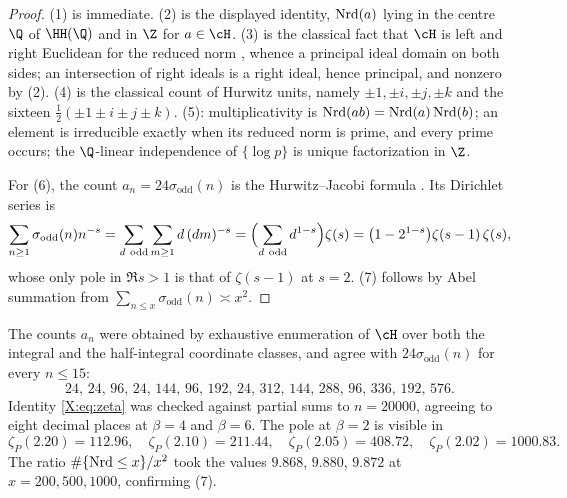 \begin{proof}
(1) is immediate. (2) is the displayed identity, $\operatorname{Nrd}(a)$ lying in the centre $\Q$ of
$\HH(\Q)$ and in $\Z$ for $a\in\cH$. (3) is the classical fact that $\cH$ is left and right
Euclidean for the reduced norm \cite{Hurwitz}, whence a principal ideal domain on both
sides; an intersection of right ideals is a right ideal, hence principal, and nonzero by (2). (4) is the classical
count of Hurwitz units, namely $\pm1,\pm i,\pm j,\pm k$ and the sixteen
$\tfrac12(\pm1\pm i\pm j\pm k)$. (5): multiplicativity is $\operatorname{Nrd}(ab)=\operatorname{Nrd}(a)\operatorname{Nrd}(b)$; an
element is irreducible exactly when its reduced norm is prime, and every prime occurs; the
$\Q$-linear independence of $\{\log p\}$ is unique factorization in $\Z$.

For (6), the count $a_n=24\sigma_{\mathrm{odd}}(n)$ is the Hurwitz--Jacobi formula
\cite{Hurwitz}. Its
Dirichlet series is
\[
\sum_{n\ge1}\sigma_{\mathrm{odd}}(n)n^{-s}
=\sum_{d\ \mathrm{odd}}\sum_{m\ge1}d\,(dm)^{-s}
=\Bigl(\sum_{d\ \mathrm{odd}}d^{1-s}\Bigr)\zeta(s)
=\bigl(1-2^{1-s}\bigr)\zeta(s-1)\,\zeta(s),
\]
whose only pole in $\Re s>1$ is that of $\zeta(s-1)$ at $s=2$. (7) follows by Abel summation
from $\sum_{n\le x}\sigma_{\mathrm{odd}}(n)\asymp x^2$.
\end{proof}

\begin{remark}\label{X:rem:num}
The counts $a_n$ were obtained by exhaustive enumeration of $\cH$ over both the integral and
the half-integral coordinate classes, and agree with $24\sigma_{\mathrm{odd}}(n)$ for every
$n\le15$:
\[
24,\,24,\,96,\,24,\,144,\,96,\,192,\,24,\,312,\,144,\,288,\,96,\,336,\,192,\,576 .
\]
Identity \eqref{X:eq:zeta} was checked against partial sums to $n=20000$, agreeing to eight
decimal places at $\beta=4$ and $\beta=6$. The pole at $\beta=2$ is visible in
\[
\zeta_P(2.20)=112.96,\quad \zeta_P(2.10)=211.44,\quad \zeta_P(2.05)=408.72,\quad \zeta_P(2.02)=1000.83 .
\]
The ratio $\#\{\operatorname{Nrd}\le x\}/x^2$ took the values $9.868$, $9.880$, $9.872$ at
$x=200,500,1000$, confirming (7).
\end{remark}


